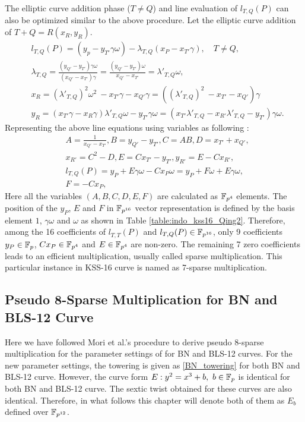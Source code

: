 The elliptic curve addition phase \texorpdfstring{($T\neq Q$)}{} and line evaluation of $ l_{T,Q}(P)$ can also be optimized similar to the above procedure. Let the elliptic curve addition of $T+Q = R(x_R, y_R)$.
\begin{eqnarray}
&  l_{T,Q}(P) = (y_p-y_{T'} \gamma \omega)- \lambda_{T,Q}(x_P-x_{T'}\gamma),  \quad \text{$T \neq Q$,} \nonumber \\
&\lambda_{T,Q}= \frac{( y_{Q'}-y_{T'})\gamma \omega}{( x_{Q'}-x_{T'})\gamma} = \frac{( y_{Q'}-y_{T'}) \omega}{x_{Q'}-x_{T'}} = \lambda'_{T,Q} \omega, \nonumber\\
& x_{R} = (\lambda'_{T,Q})^2 \omega^2 \ - x_{T'}\gamma -  x_{Q'}\gamma = ((\lambda'_{T,Q})^2  \ - x_{T'} -x_{Q'})\gamma \nonumber \\
 & y_{R}= (x_{T'} \gamma-x_{R} \gamma)\lambda'_{T,Q} \omega-y_{T'}\gamma\omega = (x_{T'}\lambda'_{T,Q} -x_{R'}\lambda'_{T,Q}-y_{T'})\gamma \omega \nonumber.
\end{eqnarray}
Representing the above line equations using variables as following :
\begin{eqnarray}
&A=\frac{1}{x_{Q'}-x_{T'}}, B=y_{Q'}-y_{T'}, C=AB, D=x_{T'}+x_{Q'},\nonumber\\
 & x_{R'}=C^2-D, E= Cx_{T'}-y_{T'}, y_{R'}=E-Cx_{R'},\nonumber\\
&l_{T,Q}(P)= y_P+E \gamma \omega-Cx_P\omega = y_P+F\omega+E \gamma \omega, \label{indo_kss16_sparse_add}\\
 & F=-Cx_P,  \nonumber
\end{eqnarray}
Here all the variables $(A,B,C, D, E, F)$  are calculated as $\mathbb{F}_{p^4}$ elements.
The  position of the $y_P$, $E$ and $F$ in $\mathbb{F}_{p^{16}}$ vector representation is defined by the basis element $1$, $\gamma\omega $ and $\omega$ as shown in Table \ref{table:indo_kss16_Qing2}. 
Therefore,  among the 16 coefficients of  $l_{T,T}(P)$ and $l_{T,Q}(P)\in \mathbb{F}_{p^{16}}$, only 9 coefficients $y_P\in {\mathbb{F}}_{p}$, $Cx_P\in \mathbb{F}_{p^4}$ and $E\in \mathbb{F}_{p^4}$ are  non-zero. The remaining 7 zero coefficients leads to an efficient multiplication, usually called sparse multiplication. This particular instance in KSS-16 curve is named as 7-sparse multiplication.


\subsection{Pseudo 8-Sparse Multiplication for BN and BLS-12 Curve}
Here we have followed Mori et al.'s \cite{PAIRING:MANS13} procedure to derive pseudo 8-sparse multiplication for the parameter settings of \cite{EPRINT:BarDuq17} for BN and BLS-12 curves. 
For the new parameter settings, the towering is given as \eqref{BN_towering} for both BN and BLS-12 curve.
However, the curve form $E:y^2=x^3+b, ~b \in {\mathbb{F}}_{p}$ is identical for both BN and BLS-12 curve.
The sextic twist obtained for these curves are also identical.
Therefore, in what follows this chapter will denote both of them as $E_b$ defined over $\mathbb{F}_{p^{12}}$.

